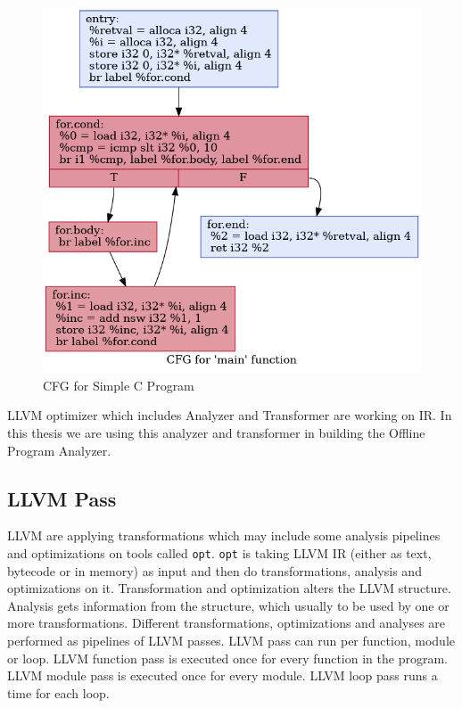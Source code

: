 \begin{figure}[htbp]
\centerline{\includegraphics[scale=.5]{Figures/03/cfg.png}}
\caption{CFG for Simple C Program}
\label{fig:cfg}
\end{figure}


LLVM optimizer \textemdash{} which includes Analyzer and Transformer \textemdash{} are working on IR. In this thesis we are using this analyzer and transformer in building the Offline Program Analyzer.

\subsection{LLVM Pass}

LLVM are applying transformations \textemdash{} which may include some analysis pipelines \textemdash{} and optimizations on tools called \texttt{opt}. \texttt{opt} is taking LLVM IR (either as text, bytecode or in memory) as input and then do transformations, analysis and optimizations on it. Transformation and optimization alters the LLVM structure. Analysis gets information from the structure, which usually to be used by one or more transformations. Different transformations, optimizations and analyses are performed as pipelines of LLVM passes. LLVM pass can run per function, module or loop. LLVM function pass is executed once for every function in the program. LLVM module pass is executed once for every module. LLVM loop pass runs a time for each loop.  

